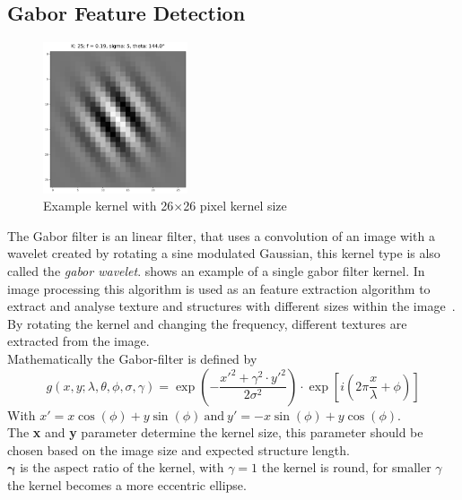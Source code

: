 \documentclass[12pt,a4paper, english,twoside]{scrartcl}
\begin{document}
    \subsection{Gabor Feature Detection}\label{sec:gabor}
      \begin{figure}
      \vspace{-1cm}
       \begin{center}
         \includegraphics[width=0.38\textwidth]{img/KLarge.png}
       \end{center}
       \caption{Example kernel with 26$\times$26 pixel kernel size}\label{fig:largeKernel}
      \end{figure}
      The Gabor filter is an linear filter, that uses a convolution of an image with a wavelet created by rotating a sine modulated Gaussian, this kernel type is also called the \textit{gabor wavelet}.
       shows an example of a single gabor filter kernel.
      In image processing this algorithm is used as an feature extraction algorithm to extract and analyse texture and structures with different sizes within the image~\autocite{Cerdan1993}. 
      By rotating the kernel and changing the frequency, different textures are extracted from the image.\\
      Mathematically the Gabor-filter is defined by
      \begin{equation}
        g(x,y; \lambda, \theta, \phi, \sigma, \gamma) = \exp \left(- \frac{x'^2 + \gamma^2\cdot y'^2}{2\sigma^2}\right) \cdot \exp \left[i \left(2\pi\frac{x}{\lambda} + \phi \right)\right] 
      \end{equation}
      With $ x' = x \cos(\phi) + y \sin(\phi)~\text{and}~y' = -x \sin(\phi) + y \cos(\phi)$.\\ 
      The \textbf{x} and \textbf{y} parameter determine the kernel size, this parameter should be chosen based on the image size and expected structure length.\\
      $\boldsymbol{\gamma}$ is the aspect ratio of the kernel, with $\gamma = 1$ the kernel is round, for smaller $\gamma$ the kernel becomes a more eccentric ellipse.\\
\end{document}
